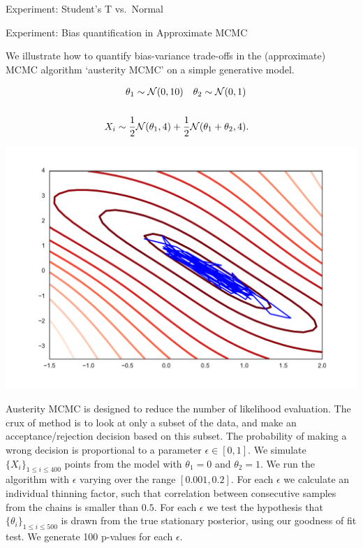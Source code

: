 \begin{frame}
\begin{columns}
\begin{column}{.32\linewidth}
\begin{block}{Experiment: Student's T vs.\ Normal}
\end{block}
\vspace{-0.75cm}


\begin{block}{Experiment: Bias quantification in Approximate MCMC}

 We  illustrate how to quantify bias-variance trade-offs in the (approximate) MCMC algorithm `austerity MCMC' \cite{korattikara2013austerity} on a simple generative model.

\begin{minipage}{.45\linewidth}
\begin{align*}
\theta_{1}\sim{\cal N}(0,10)\quad\theta_{2}\sim{\cal N}(0,1)\\\\
X_{i}\sim\frac{1}{2}{\cal N}(\theta_{1},4)+\frac{1}{2}{\cal N}(\theta_{1}+\theta_{2},4) & .
\end{align*}
\end{minipage}
\begin{minipage}{.45\linewidth}
\includegraphics[width=\textwidth]{../../presentation/img/sgld_trace_and_density.pdf}
\end{minipage}


\footnotesize
Austerity MCMC is designed to reduce the number
of likelihood evaluation. The crux of method is to look at only a subset of the data,
and make an acceptance/rejection decision based on this subset. The
probability of making a wrong decision is proportional to a parameter
$\epsilon\in[0,1]$. We simulate $\{X_{i}\}_{1\leq i\leq400}$ points from the model
with $\theta_{1}=0$ and $\theta_{2}=1$. We run the algorithm with $\epsilon$ varying
over the range $[0.001,0.2]$. For each $\epsilon$ we calculate an
individual thinning factor, such that correlation between consecutive
 samples from the chains is smaller than $0.5$. For each $\epsilon$ we test the
hypothesis that $\{\theta_{i}\}_{1\leq i\leq500}$ is drawn from the
true stationary posterior, using our goodness of fit test. We generate
100 p-values for each $\epsilon$.



\end{block}
\end{column}
\end{columns}
\end{frame}
